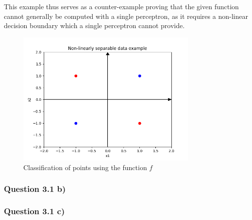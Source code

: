 \documentclass{article}
\begin{document}
This example thus serves as a counter-example proving that the given function cannot generally be computed with a single perceptron, as it requires a non-linear decision boundary which a single perceptron cannot provide. 

\begin{figure}[H]
    \centering
    \includegraphics[width=0.8\textwidth]{"plots/3a.png"}
    \caption{Classification of points using the function \( f \)}
    \label{3a Plot}
\end{figure}
\subsubsection{Question 3.1 b)}
\subsubsection{Question 3.1 c)}
\end{document}
